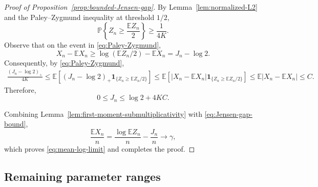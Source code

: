 \documentclass[a4paper,fleqn]{cas-sc}
\numberwithin{equation}{section}
\theoremstyle{plain}
\theoremstyle{definition}
\newcommand{\E}{\mathbb E}
\newcommand{\Pp}{\mathbb P}
\newcommand{\ind}{\mathbf 1}
\begin{document}
\begin{proof}[Proof of Proposition~\ref{prop:bounded-Jensen-gap}]
By Lemma~\ref{lem:normalized-L2} and the Paley--Zygmund inequality at
threshold $1/2$,
\begin{equation}
 \Pp\left\{Z_n\ge\frac{\E Z_n}{2}\right\}\ge\frac1{4K}.
 \label{eq:Paley-Zygmund}
\end{equation}
Observe that on the event in \eqref{eq:Paley-Zygmund},
\begin{equation}
 X_n-\E X_n\ge\log(\E Z_n/2)-\E X_n=J_n-\log2.
 \label{eq:jensen-event-comparison}
\end{equation}
Consequently, by \eqref{eq:Paley-Zygmund},
\[
\begin{aligned}
 \frac{(J_n-\log2)_+}{4K}
 \le\E\left[(J_n-\log2)_+
   \ind_{\{Z_n\ge\E Z_n/2\}}\right]
 \le\E\left[|X_n-\E X_n|
   \ind_{\{Z_n\ge\E Z_n/2\}}\right]
 \le\E|X_n-\E X_n|\le C.
\end{aligned}
\]
Therefore,
\begin{equation}
 0\le J_n\le\log2+4KC.
 \label{eq:Jensen-gap-bound}
\end{equation}

Combining Lemma~\ref{lem:first-moment-submultiplicativity} with
\eqref{eq:Jensen-gap-bound},
\[
 \frac{\E X_n}{n}
 =\frac{\log\E Z_n}{n}-\frac{J_n}{n}
 \longrightarrow \gamma,
\]
which proves \eqref{eq:mean-log-limit} and completes the proof.
\end{proof}

\subsection{Remaining parameter ranges}
\label{sec:remaining-ranges}
\end{document}
